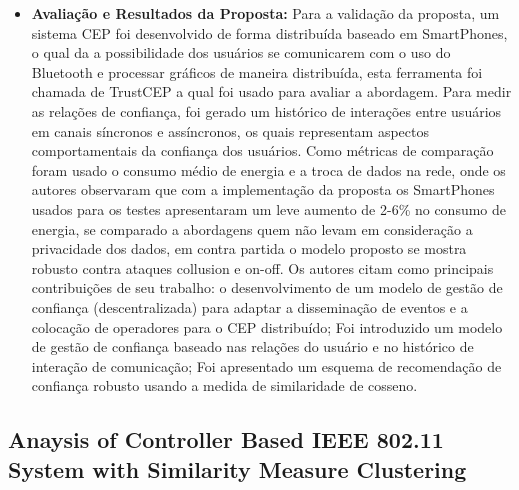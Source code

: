 \documentclass[tid,table]{texufpel} %
\begin{document}
\begin{itemize}
	
	\item \textbf{Avaliação e Resultados da Proposta:} Para a validação da proposta, um sistema CEP foi desenvolvido de forma distribuída baseado em SmartPhones, o qual da a possibilidade dos usuários se comunicarem com o uso do Bluetooth e processar gráficos de maneira distribuída, esta ferramenta foi chamada de TrustCEP a qual foi usado para avaliar a abordagem. Para medir as relações de confiança, foi gerado um histórico de interações entre usuários em canais síncronos e assíncronos, os quais representam aspectos comportamentais da confiança dos usuários. Como métricas de comparação foram usado o consumo médio de energia e a troca de dados na rede, onde os autores observaram que com a implementação da proposta os SmartPhones usados para os testes apresentaram um leve aumento de 2-6\% no consumo de energia, se comparado a abordagens quem não levam em consideração a privacidade dos dados, em contra partida o modelo proposto se mostra robusto contra ataques collusion e on-off.
	Os autores citam como principais contribuições de seu trabalho: o desenvolvimento de um modelo de gestão de confiança (descentralizada) para adaptar a disseminação de eventos e a colocação de operadores para o CEP distribuído; Foi introduzido um modelo de gestão de confiança baseado nas relações do usuário e no histórico de interação de comunicação; Foi apresentado um esquema de recomendação de confiança robusto usando a medida de similaridade de cosseno.
	
	
\end{itemize}

\subsection{Anaysis of Controller Based IEEE 802.11 System with Similarity Measure Clustering}
\end{document}
